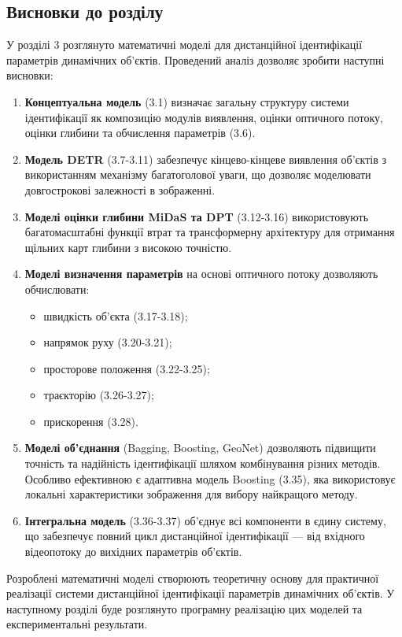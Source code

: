 \documentclass[14pt, a4paper]{extarticle}
\numberwithin{equation}{section}
\begin{document}
\subsection{Висновки до розділу}

У розділі 3 розглянуто математичні моделі для дистанційної ідентифікації параметрів динамічних об'єктів. Проведений аналіз дозволяє зробити наступні висновки:

\begin{enumerate}
    \item \textbf{Концептуальна модель} (3.1) визначає загальну структуру системи ідентифікації як композицію модулів виявлення, оцінки оптичного потоку, оцінки глибини та обчислення параметрів (3.6).
    
    \item \textbf{Модель DETR} (3.7-3.11) забезпечує кінцево-кінцеве виявлення об'єктів з використанням механізму багатоголової уваги, що дозволяє моделювати довгострокові залежності в зображенні.
    
    \item \textbf{Моделі оцінки глибини MiDaS та DPT} (3.12-3.16) використовують багатомасштабні функції втрат та трансформерну архітектуру для отримання щільних карт глибини з високою точністю.
    
    \item \textbf{Моделі визначення параметрів} на основі оптичного потоку дозволяють обчислювати:
    \begin{itemize}
        \item швидкість об'єкта (3.17-3.18);
        \item напрямок руху (3.20-3.21);
        \item просторове положення (3.22-3.25);
        \item траєкторію (3.26-3.27);
        \item прискорення (3.28).
    \end{itemize}
    
    \item \textbf{Моделі об'єднання} (Bagging, Boosting, GeoNet) дозволяють підвищити точність та надійність ідентифікації шляхом комбінування різних методів. Особливо ефективною є адаптивна модель Boosting (3.35), яка використовує локальні характеристики зображення для вибору найкращого методу.
    
    \item \textbf{Інтегральна модель} (3.36-3.37) об'єднує всі компоненти в єдину систему, що забезпечує повний цикл дистанційної ідентифікації — від вхідного відеопотоку до вихідних параметрів об'єктів.
\end{enumerate}

Розроблені математичні моделі створюють теоретичну основу для практичної реалізації системи дистанційної ідентифікації параметрів динамічних об'єктів. У наступному розділі буде розглянуто програмну реалізацію цих моделей та експериментальні результати.
\end{document}
